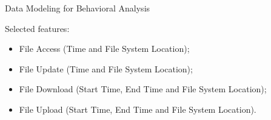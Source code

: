 \documentclass[newPxFont, numfooter, sectionpages]{beamer}
\begin{document}
\begin{frame}[c]{Data Modeling for Behavioral Analysis}
	
	Selected features:
	\begin{itemize}
		\item File Access (Time and File System Location);
		\item File Update (Time and File System Location);
		\item File Download (Start Time, End Time and File System Location);
		\item File Upload (Start Time, End Time and File System Location).
	\end{itemize}
	
\end{frame}
\end{document}
